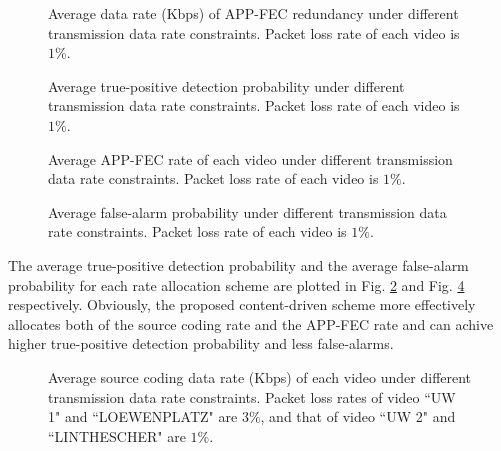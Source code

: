 \documentclass[journal]{IEEEtran}
\begin{document}
\begin{figure}[t]
\caption{Average data rate (Kbps) of APP-FEC redundancy under different transmission data rate constraints. Packet loss rate of each video is $1\%$.}\label{fig:avg_fec_redundancy_rate_1}
\end{figure}

\begin{figure}[tb]
\caption{Average true-positive detection probability under different transmission data rate constraints. Packet loss rate of each video is $1\%$.}\label{fig:true_positive_1}
\end{figure}

\begin{figure}[t]
\caption{Average APP-FEC rate of each video under different transmission data rate constraints. Packet loss rate of each video is $1\%$.}\label{fig:avg_fec_rate_1}
\end{figure}


\begin{figure}[tb]
\caption{Average false-alarm probability under different transmission data rate constraints. Packet loss rate of each video is $1\%$.}\label{fig:false_alarm_1}
\end{figure}


\clearpage
The average true-positive detection probability and the average false-alarm probability for each rate allocation scheme are plotted in Fig. \ref{fig:true_positive_1} and Fig. \ref{fig:false_alarm_1} respectively. Obviously, the proposed content-driven scheme more effectively allocates both of the source coding rate and the APP-FEC rate and can achive higher true-positive detection probability and less false-alarms.

\begin{figure}[t]
\caption{Average source coding data rate (Kbps) of each video under different transmission data rate constraints. Packet loss rates of video ``UW 1" and ``LOEWENPLATZ" are $3\%$, and that of video ``UW 2" and ``LINTHESCHER" are $1\%$.}\label{fig:avg_dataRate_2}
\end{figure}
\end{document}

